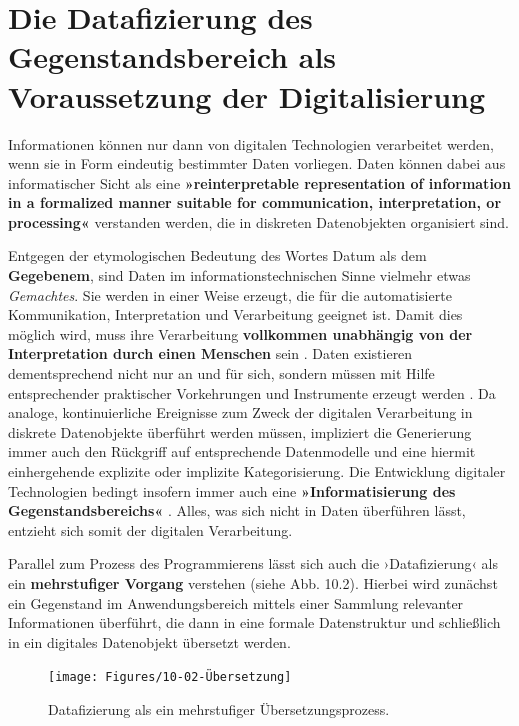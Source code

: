 \documentclass[
  a4paper,
]{book}
\begin{document}
\section{Die Datafizierung des Gegenstandsbereich als Voraussetzung der Digitalisierung}\label{die-datafizierung-des-gegenstandsbereich-als-voraussetzung-der-digitalisierung}

Informationen können nur dann von digitalen Technologien verarbeitet werden, wenn sie in Form eindeutig bestimmter Daten vorliegen. Daten können dabei aus informatischer Sicht als eine \textbf{»reinterpretable representation of information in a formalized manner suitable for communication, interpretation, or processing«} \citep{iec23822015InformationTechnologyVocabulary2015} verstanden werden, die in diskreten Datenobjekten organisiert sind.

Entgegen der etymologischen Bedeutung des Wortes Datum als dem \textbf{Gegebenem}, sind Daten im informationstechnischen Sinne vielmehr etwas \emph{Gemachtes}. Sie werden in einer Weise erzeugt, die für die automatisierte Kommunikation, Interpretation und Verarbeitung geeignet ist. Damit dies möglich wird, muss ihre Verarbeitung \textbf{vollkommen unabhängig von der Interpretation durch einen Menschen} sein \citep[vgl.][]{nakeAlgorithmischeZeichen2001} . Daten existieren dementsprechend nicht nur an und für sich, sondern müssen mit Hilfe entsprechender praktischer Vorkehrungen und Instrumente erzeugt werden \citep[vgl. z.B.][]{gitelmanIntroduction2013, giessmannWasIstDatenkritik2014}. Da analoge, kontinuierliche Ereignisse zum Zweck der digitalen Verarbeitung in diskrete Datenobjekte überführt werden müssen, impliziert die Generierung immer auch den Rückgriff auf entsprechende Datenmodelle und eine hiermit einhergehende explizite oder implizite Kategorisierung. Die Entwicklung digitaler Technologien bedingt insofern immer auch eine \textbf{»Informatisierung des Gegenstandsbereichs«} \citep[S. 245]{floydAutooperationaleFormUnd1997}. Alles, was sich nicht in Daten überführen lässt, entzieht sich somit der digitalen Verarbeitung.

Parallel zum Prozess des Programmierens lässt sich auch die ›Datafizierung‹ als ein \textbf{mehrstufiger Vorgang} verstehen (siehe {Abb. 10.2}). Hierbei wird zunächst ein Gegenstand im Anwendungsbereich mittels einer Sammlung relevanter Informationen überführt, die dann in eine formale Datenstruktur und schließlich in ein digitales Datenobjekt übersetzt werden.

\begin{figure}

{\centering \texttt{[image: Figures/10-02-Übersetzung]} 

}

\caption{Datafizierung als ein mehrstufiger Übersetzungsprozess.}\label{fig:fig16}
\end{figure}
\end{document}
